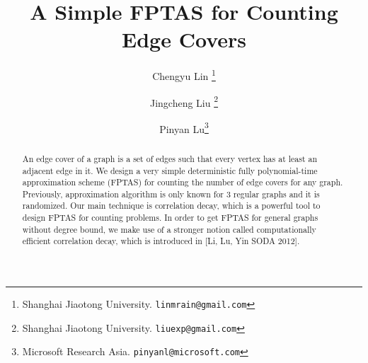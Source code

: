 \documentclass[a4paper,11pt]{article}
\title{A Simple FPTAS for Counting Edge Covers}
\date{}
\begin{document}
\author{
	Chengyu Lin
	\thanks{Shanghai Jiaotong University. {\tt linmrain@gmail.com}}
	\and
	Jingcheng Liu
	\thanks{Shanghai Jiaotong University. {\tt liuexp@gmail.com}}
	\and
	Pinyan Lu\thanks{Microsoft Research Asia. {\tt pinyanl@microsoft.com}}
}
\maketitle
\begin{abstract}
An edge cover of a graph is a set of edges such that every vertex has at least an adjacent edge in it. We design a very simple deterministic fully polynomial-time approximation scheme  (FPTAS) for counting the number of edge covers for any graph. Previously, approximation algorithm is only known for 3 regular graphs and it is randomized. Our main technique is correlation decay, which is a powerful tool to design FPTAS for counting problems. In order to get FPTAS for general graphs without degree bound, we make use of a stronger notion called computationally efficient correlation decay, which is introduced in [Li, Lu, Yin SODA 2012].  
\end{abstract}
















\end{document}
